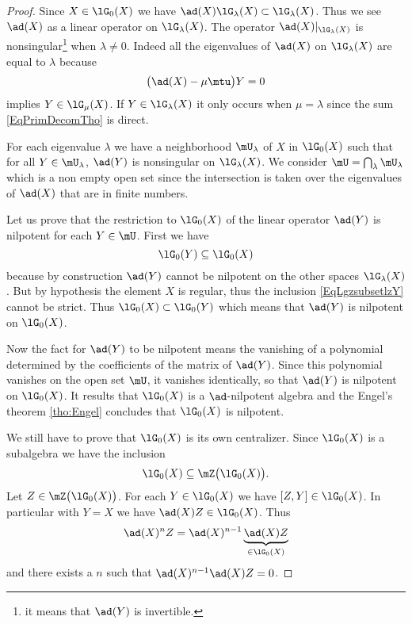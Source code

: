 \begin{proof}
    Since \( X\in\lG_0(X)\) we have \( \ad(X)\lG_{\lambda}(X)\subset\lG_{\lambda}(X)\). Thus we see \( \ad(X)\) as a linear operator on \( \lG_{\lambda}(X)\). The operator \( \ad(X)|_{\lG_{\lambda}(X)}\) is nonsingular\footnote{it means that \( \ad(Y)\) is invertible.} when \( \lambda\neq 0\). Indeed all the eigenvalues of \( \ad(X)\) on \( \lG_{\lambda}(X)\) are equal to \( \lambda\) because  
    \begin{equation}
        \big( \ad(X)-\mu\mtu \big)Y=0
    \end{equation}
    implies \( Y\in\lG_{\mu}(X)\). If \( Y\in\lG_{\lambda}(X)\) it only occurs when \( \mu=\lambda\) since the sum \eqref{EqPrimDecomTho} is direct.

    For each eigenvalue \( \lambda\) we have a neighborhood \( \mU_{\lambda}\) of $X$ in \( \lG_0(X)\) such that for all \( Y\in\mU_{\lambda}\), \( \ad(Y)\) is nonsingular on \( \lG_{\lambda}(X)\). We consider \( \mU=\bigcap_{\lambda}\mU_{\lambda}\) which is a non empty open set since the intersection is taken over the eigenvalues of \( \ad(X)\) that are in finite numbers.

    Let us prove that the restriction to \( \lG_0(X)\) of the linear operator \( \ad(Y)\) is nilpotent for each \( Y\in\mU\). First we have 
    \begin{equation}        \label{EqLgzsubsetlzY}
        \lG_0(Y)\subseteq\lG_0(X)
    \end{equation}
    because by construction \( \ad(Y)\) cannot be nilpotent on the other spaces \( \lG_{\lambda}(X)\). But by hypothesis the element \( X\) is regular, thus the inclusion \eqref{EqLgzsubsetlzY} cannot be strict. Thus \( \lG_0(X)\subset\lG_0(Y)\) which means that \( \ad(Y)\) is nilpotent on \( \lG_0(X)\).

    Now the fact for \( \ad(Y)\) to be nilpotent means the vanishing of a polynomial determined by the coefficients of the matrix of \( \ad(Y)\). Since this polynomial vanishes on the open set \( \mU\), it vanishes identically, so that \( \ad(Y)\) is nilpotent on \( \lG_0(X)\). It results that \( \lG_0(X)\) is a \( \ad\)-nilpotent algebra and the Engel's theorem \ref{tho:Engel} concludes that \( \lG_0(X)\) is nilpotent.

    We still have to prove that \( \lG_0(X)\) is its own centralizer. Since \( \lG_0(X)\) is a subalgebra we have the inclusion
    \begin{equation}
        \lG_0(X)\subseteq\mZ\big( \lG_0(X) \big).
    \end{equation}
    Let \( Z\in\mZ\big( \lG_0(X) \big)\). For each \( Y\in\lG_0(X)\) we have \( [Z,Y]\in\lG_0(X)\). In particular with \( Y=X\) we have \( \ad(X)Z\in\lG_0(X)\). Thus
    \begin{equation}
        \ad(X)^nZ=\ad(X)^{n-1}\underbrace{\ad(X)Z}_{\in\lG_0(X)}
    \end{equation}
    and there exists a \( n\) such that \( \ad(X)^{n-1}\ad(X)Z=0\).
\end{proof}

